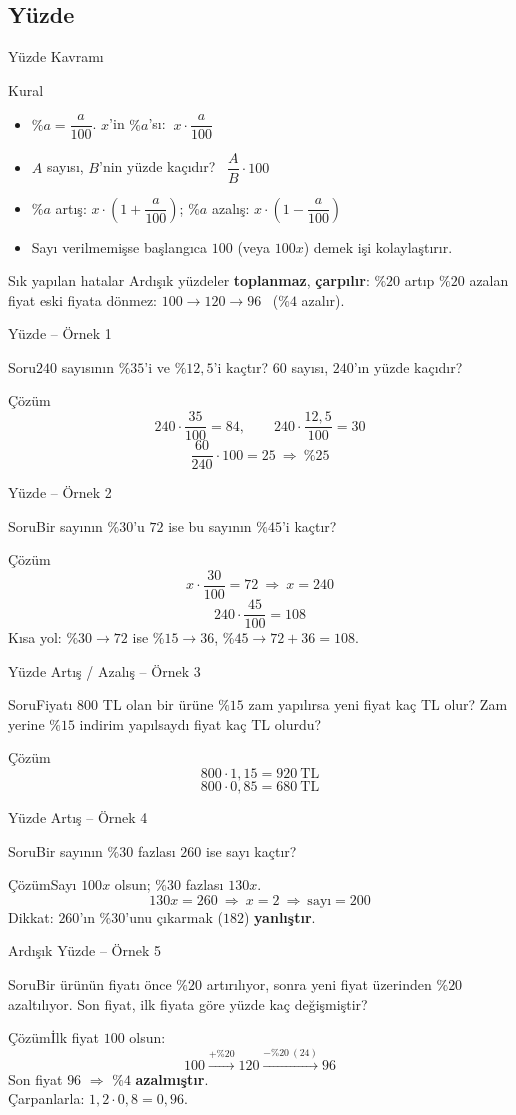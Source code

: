 \documentclass[aspectratio=169,11pt]{beamer}
\newcommand{\soru}[3]{%
\begin{frame}{#1}
  \begin{block}{Soru}\large #2\end{block}
  \pause
  \begin{exampleblock}{Çözüm}\large #3\end{exampleblock}
\end{frame}}
\begin{document}
\subsection{Yüzde}
\begin{frame}{Yüzde Kavramı}
\begin{block}{Kural}
\begin{itemize}
\item \(\%a=\dfrac{a}{100}\). \quad \(x\)'in \(\%a\)'sı: \(\ x\cdot\dfrac{a}{100}\)
\item \(A\) sayısı, \(B\)'nin yüzde kaçıdır? \ \(\dfrac{A}{B}\cdot 100\)
\item \(\%a\) artış: \(x\cdot\left(1+\dfrac{a}{100}\right)\); \quad \(\%a\) azalış: \(x\cdot\left(1-\dfrac{a}{100}\right)\)
\item Sayı verilmemişse başlangıca \(100\) (veya \(100x\)) demek işi kolaylaştırır.
\end{itemize}
\end{block}
\begin{alertblock}{Sık yapılan hatalar}
Ardışık yüzdeler \textbf{toplanmaz}, \textbf{çarpılır}: \(\%20\) artıp \(\%20\) azalan fiyat eski fiyata dönmez:
\(100\to 120\to 96\) \ (\(\%4\) azalır).
\end{alertblock}
\end{frame}

\soru{Yüzde -- Örnek 1}
{\(240\) sayısının \(\%35\)'i ve \(\%12{,}5\)'i kaçtır? \(60\) sayısı, \(240\)'ın yüzde kaçıdır?}
{\[240\cdot\frac{35}{100}=84,\qquad 240\cdot\frac{12{,}5}{100}=30\]
\[\frac{60}{240}\cdot 100=25\ \Rightarrow\ \%25\]}

\soru{Yüzde -- Örnek 2}
{Bir sayının \(\%30\)'u \(72\) ise bu sayının \(\%45\)'i kaçtır?}
{\[x\cdot\frac{30}{100}=72\ \Rightarrow\ x=240\]
\[240\cdot\frac{45}{100}=108\]
Kısa yol: \(\%30\to 72\) ise \(\%15\to 36\), \(\%45\to 72+36=108\).}

\soru{Yüzde Artış / Azalış -- Örnek 3}
{Fiyatı \(800\) TL olan bir ürüne \(\%15\) zam yapılırsa yeni fiyat kaç TL olur? Zam yerine \(\%15\) indirim yapılsaydı fiyat kaç TL olurdu?}
{\[800\cdot 1{,}15=920\ \text{TL}\]
\[800\cdot 0{,}85=680\ \text{TL}\]}

\soru{Yüzde Artış -- Örnek 4}
{Bir sayının \(\%30\) fazlası \(260\) ise sayı kaçtır?}
{Sayı \(100x\) olsun; \(\%30\) fazlası \(130x\).
\[130x=260\ \Rightarrow\ x=2\ \Rightarrow\ \text{sayı}=200\]
Dikkat: \(260\)'ın \(\%30\)'unu çıkarmak (\(182\)) \textbf{yanlıştır}.}

\soru{Ardışık Yüzde -- Örnek 5}
{Bir ürünün fiyatı önce \(\%20\) artırılıyor, sonra yeni fiyat üzerinden \(\%20\) azaltılıyor. Son fiyat, ilk fiyata göre yüzde kaç değişmiştir?}
{İlk fiyat \(100\) olsun:
\[100\xrightarrow{+\%20}120\xrightarrow{-\%20\ (24)}96\]
Son fiyat \(96\) \(\Rightarrow\) \(\%4\) \textbf{azalmıştır}.\\[3pt]
Çarpanlarla: \(1{,}2\cdot 0{,}8=0{,}96\).}
\end{document}
